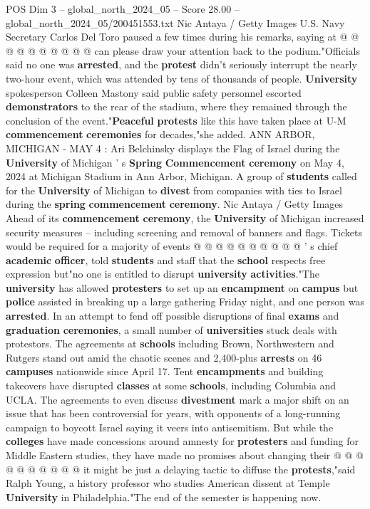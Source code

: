 \begin{textsample}{POS Dim 3 – global\_north\_2024\_05 – Score 28.00 – global\_north\_2024\_05/200451553.txt}
Nic Antaya / Getty Images U.S.
Navy Secretary Carlos Del Toro paused a few times during his remarks, saying at @ @ @ @ @ @ @ @ @ @ can please draw your attention back to the podium."Officials said no one was \textbf{arrested}, and the \textbf{protest} didn't seriously interrupt the nearly two-hour event, which was attended by tens of thousands of people. \textbf{University} spokesperson Colleen Mastony said public safety personnel escorted \textbf{demonstrators} to the rear of the stadium, where they remained through the conclusion of the event."\textbf{Peaceful} \textbf{protests} like this have taken place at U-M \textbf{commencement} \textbf{ceremonies} for decades,"she added.
ANN ARBOR, MICHIGAN - MAY 4 : Ari Belchinsky displays the Flag of Israel during the \textbf{University} of Michigan ' s \textbf{Spring} \textbf{Commencement} \textbf{ceremony} on May 4, 2024 at Michigan Stadium in Ann Arbor, Michigan.
A group of \textbf{students} called for the \textbf{University} of Michigan to \textbf{divest} from companies with ties to Israel during the \textbf{spring} \textbf{commencement} \textbf{ceremony}.
Nic Antaya / Getty Images Ahead of its \textbf{commencement} \textbf{ceremony}, the \textbf{University} of Michigan increased security measures -- including screening and removal of banners and flags.
Tickets would be required for a majority of events @ @ @ @ @ @ @ @ @ @ ' s chief \textbf{academic} \textbf{officer}, told \textbf{students} and staff that the \textbf{school} respects free expression but"no one is entitled to disrupt \textbf{university} \textbf{activities}."The \textbf{university} has allowed \textbf{protesters} to set up an \textbf{encampment} on \textbf{campus} but \textbf{police} assisted in breaking up a large gathering Friday night, and one person was \textbf{arrested}.
In an attempt to fend off possible disruptions of final \textbf{exams} and \textbf{graduation} \textbf{ceremonies}, a small number of \textbf{universities} stuck deals with protestors.
The agreements at \textbf{schools} including Brown, Northwestern and Rutgers stand out amid the chaotic scenes and 2,400-plus \textbf{arrests} on 46 \textbf{campuses} nationwide since April 17.
Tent \textbf{encampments} and building takeovers have disrupted \textbf{classes} at some \textbf{schools}, including Columbia and UCLA.
The agreements to even discuss \textbf{divestment} mark a major shift on an issue that has been controversial for years, with opponents of a long-running campaign to boycott Israel saying it veers into antisemitism.
But while the \textbf{colleges} have made concessions around amnesty for \textbf{protesters} and funding for Middle Eastern studies, they have made no promises about changing their @ @ @ @ @ @ @ @ @ @ it might be just a delaying tactic to diffuse the \textbf{protests},"said Ralph Young, a history professor who studies American dissent at Temple \textbf{University} in Philadelphia."The end of the semester is happening now.

\end{textsample}
